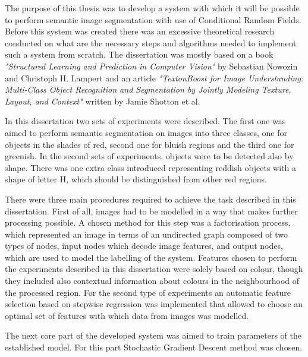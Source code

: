 The purpose of this thesis was to develop a system with which it will be possible to perform semantic image segmentation with use of Conditional Random Fields. Before this system was created there was an excessive theoretical research conducted on what are the necessary steps and algorithms needed to implement such a system from scratch. The dissertation was mostly based on a book \textit{"Structured Learning and Prediction in Computer Vision"} by Sebastian Nowozin and Christoph H. Lampert and an article \textit{"TextonBoost for Image Understanding: Multi-Class Object Recognition and Segmentation by Jointly Modeling Texture, Layout, and Context"} written by Jamie Shotton et al. 

In this dissertation two sets of experiments were described. The first one was aimed to perform semantic segmentation on images into three classes, one for objects in the shades of red, second one for bluish regions and the third one for greenish. In the second sets of experiments, objects were to be detected also by shape. There was one extra class introduced representing reddish objects with a shape of letter H, which should be distinguished from other red regions. 

There were three main procedures required to achieve the task described in this dissertation. First of all, images had to be modelled in a way that makes further processing possible. A chosen method for this step was a factorisation process, which represented an image in terms of an undirected graph composed of two types of nodes, input nodes which decode image features, and output nodes, which are used to model the labelling of the system. Features chosen to perform the experiments described in this dissertation were solely based on colour, though they included also contextual information about colours in the neighbourhood of the processed region. For the second type of experiments an automatic feature selection based on stepwise regression was implemented that allowed to choose an optimal set of features with which data from images was modelled. 

The next core part of the developed system was aimed to train parameters of the established model. For this part Stochastic Gradient Descent method was chosen. 